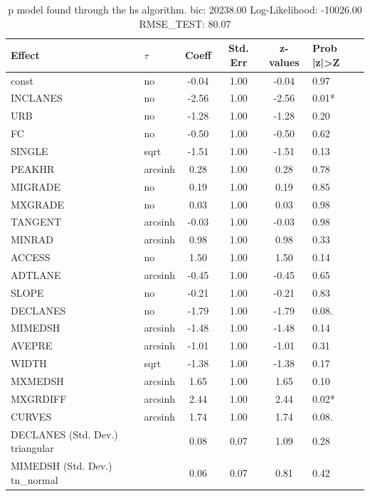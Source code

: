 \begin{table}
	\caption{p model found through the hs algorithm. bic: 20238.00 Log-Likelihood: -10026.00 RMSE_TEST: 80.07}
	\begin{center}
		\begin{tabular}{|l|l|c|c|c|l|}
			\hline
			Effect & $\tau$ & Coeff & Std. Err & z-values & Prob |z|>Z \\
			\hline
			const & no & -0.04 & 1.00 & -0.04 & 0.97 \\
			\hline
			INCLANES & no & -2.56 & 1.00 & -2.56 & 0.01* \\
			\hline
			URB & no & -1.28 & 1.00 & -1.28 & 0.20 \\
			\hline
			FC & no & -0.50 & 1.00 & -0.50 & 0.62 \\
			\hline
			SINGLE & sqrt & -1.51 & 1.00 & -1.51 & 0.13 \\
			\hline
			PEAKHR & arcsinh & 0.28 & 1.00 & 0.28 & 0.78 \\
			\hline
			MIGRADE & no & 0.19 & 1.00 & 0.19 & 0.85 \\
			\hline
			MXGRADE & no & 0.03 & 1.00 & 0.03 & 0.98 \\
			\hline
			TANGENT & arcsinh & -0.03 & 1.00 & -0.03 & 0.98 \\
			\hline
			MINRAD & arcsinh & 0.98 & 1.00 & 0.98 & 0.33 \\
			\hline
			ACCESS & no & 1.50 & 1.00 & 1.50 & 0.14 \\
			\hline
			ADTLANE & arcsinh & -0.45 & 1.00 & -0.45 & 0.65 \\
			\hline
			SLOPE & no & -0.21 & 1.00 & -0.21 & 0.83 \\
			\hline
			DECLANES & no & -1.79 & 1.00 & -1.79 & 0.08. \\
			\hline
			MIMEDSH & arcsinh & -1.48 & 1.00 & -1.48 & 0.14 \\
			\hline
			AVEPRE & arcsinh & -1.01 & 1.00 & -1.01 & 0.31 \\
			\hline
			WIDTH & sqrt & -1.38 & 1.00 & -1.38 & 0.17 \\
			\hline
			MXMEDSH & arcsinh & 1.65 & 1.00 & 1.65 & 0.10 \\
			\hline
			MXGRDIFF & arcsinh & 2.44 & 1.00 & 2.44 & 0.02* \\
			\hline
			CURVES & arcsinh & 1.74 & 1.00 & 1.74 & 0.08. \\
			\hline
			DECLANES (Std. Dev.) triangular &  & 0.08 & 0.07 & 1.09 & 0.28 \\
			\hline
			MIMEDSH (Std. Dev.) tn_normal &  & 0.06 & 0.07 & 0.81 & 0.42 \\

\end{tabular}
\end{center}
\end{table}

